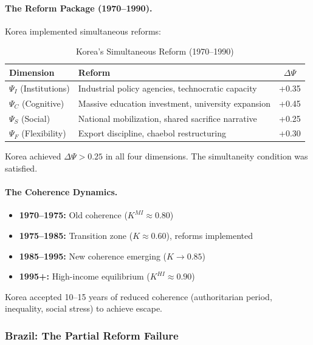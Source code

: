 \paragraph{The Reform Package (1970--1990).}
Korea implemented simultaneous reforms:

\begin{table}[htbp]
\centering
\caption{Korea's Simultaneous Reform (1970--1990)}
\label{tab:korea-reforms}
\begin{tabular}{@{}llc@{}}
\toprule
\textbf{Dimension} & \textbf{Reform} & \textbf{$\Delta \Psi$} \\
\midrule
$\Psi_I$ (Institutions) & Industrial policy agencies, technocratic capacity & +0.35 \\
$\Psi_C$ (Cognitive) & Massive education investment, university expansion & +0.45 \\
$\Psi_S$ (Social) & National mobilization, shared sacrifice narrative & +0.25 \\
$\Psi_F$ (Flexibility) & Export discipline, chaebol restructuring & +0.30 \\
\bottomrule
\end{tabular}
\end{table}

Korea achieved $\Delta \Psi > 0.25$ in all four dimensions. The simultaneity 
condition was satisfied.

\paragraph{The Coherence Dynamics.}
\begin{itemize}
    \item \textbf{1970--1975:} Old coherence ($K^{MI} \approx 0.80$)
    \item \textbf{1975--1985:} Transition zone ($K \approx 0.60$), reforms implemented
    \item \textbf{1985--1995:} New coherence emerging ($K \to 0.85$)
    \item \textbf{1995+:} High-income equilibrium ($K^{HI} \approx 0.90$)
\end{itemize}

Korea accepted 10--15 years of reduced coherence (authoritarian period, 
inequality, social stress) to achieve escape.

\subsubsection{Brazil: The Partial Reform Failure}

